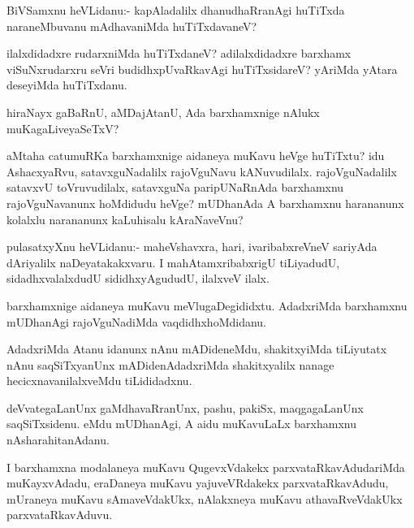 \documentclass{article}
\begin{document}
\begin{mn}
BiVSamxnu heVLidanu:- kapAladalilx dhanudhaRranAgi huTiTxda
naraneMbuvanu mAdhavaniMda huTiTxdavaneV?
\end{mn}

\begin{mn}%
ilalxdidadxre rudarxniMda huTiTxdaneV? adilalxdidadxre barxhamx
viSuNxrudarxru seVri budidhxpUvaRkavAgi huTiTxsidareV? yAriMda yAtara
deseyiMda huTiTxdanu.
\end{mn}

\begin{mn}
hiraNayx gaBaRnU, aMDajAtanU, Ada barxhamxnige nAlukx muKagaLiveyaSeTxV?
\end{mn}

\begin{mn}%
aMtaha catumuRKa barxhamxnige aidaneya muKavu heVge huTiTxtu? idu
AshacxyaRvu, satavxguNadalilx rajoVguNavu
kANuvudilalx. rajoVguNadalilx satavxvU toVruvudilalx, satavxguNa
paripUNaRnAda barxhamxnu rajoVguNavanunx hoMdidudu heVge? mUDhanAda A
barxhamxnu harananunx kolalxlu narananunx kaLuhisalu kAraNaveVnu?
\end{mn}

\begin{mn}
pulasatxyXnu heVLidanu:- maheVshavxra, hari, ivaribabxreVneV sariyAda
dAriyalilx naDeyatakakxvaru. I mahAtamxribabxrigU tiLiyadudU,
sidadhxvalalxdudU sididhxyAgududU, ilalxveV ilalx.
\end{mn}

\begin{mn}%
barxhamxnige aidaneya muKavu meVlugaDegididxtu. AdadxriMda barxhamxnu
mUDhanAgi rajoVguNadiMda vaqdidhxhoMdidanu.
\end{mn}

\begin{mn}
AdadxriMda Atanu idanunx nAnu mADideneMdu, shakitxyiMda tiLiyutatx
nAnu saqSiTxyanUnx mADidenAdadxriMda shakitxyalilx nanage
hecicxnavanilalxveMdu tiLididadxnu.
\end{mn}

\begin{mn}
deVvategaLanUnx gaMdhavaRranUnx, pashu, pakiSx, maqgagaLanUnx
saqSiTxsidenu. eMdu mUDhanAgi, A aidu muKavuLaLx barxhamxnu
nAsharahitanAdanu.
\end{mn}

\begin{mn}
I barxhamxna modalaneya muKavu QugevxVdakekx parxvataRkavAdudariMda
muKayxvAdadu, eraDaneya muKavu yajuveVRdakekx parxvataRkavAdudu,
mUraneya muKavu sAmaveVdakUkx, nAlakxneya muKavu athavaRveVdakUkx parxvataRkavAduvu.
\end{mn}
\end{document}
